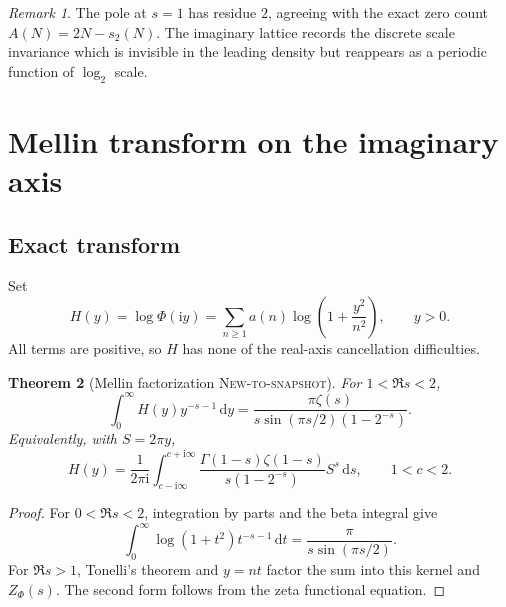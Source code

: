 \documentclass[11pt,oneside]{article}
\numberwithin{equation}{section}
\newtheorem{theorem}{Theorem}[section]
\theoremstyle{definition}
\theoremstyle{remark}
\newtheorem{remark}[theorem]{Remark}
\newcommand{\dd}{\,\mathrm d}
\newcommand{\ii}{\mathrm i}
\newcommand{\NewResult}{\textsc{New-to-snapshot}}
\begin{document}
\begin{remark}
The pole at $s=1$ has residue $2$, agreeing with the exact zero count
$A(N)=2N-s_2(N)$.  The imaginary lattice records the discrete scale invariance
which is invisible in the leading density but reappears as a periodic function
of $\log_2$ scale.
\end{remark}

\section{Mellin transform on the imaginary axis}
\label{sec:mellin}

\subsection{Exact transform}

Set
\begin{equation}
 H(y)=\log\Phi(\ii y)
     =\sum_{n\ge1}a(n)\log\left(1+\frac{y^2}{n^2}\right),
 \qquad y>0.                                               \label{eq:H}
\end{equation}
All terms are positive, so $H$ has none of the real-axis cancellation difficulties.

\begin{theorem}[Mellin factorization \NewResult]
\label{thm:Mellin}
For $1<\Re s<2$,
\begin{equation}
 \int_0^\infty H(y)y^{-s-1}\dd y
 =\frac{\pi\zeta(s)}{s\sin(\pi s/2)(1-2^{-s})}.            \label{eq:Mellin}
\end{equation}
Equivalently, with $S=2\pi y$,
\begin{equation}
 H(y)=\frac1{2\pi\ii}\int_{c-\ii\infty}^{c+\ii\infty}
 \frac{\Gamma(1-s)\zeta(1-s)}{s(1-2^{-s})}S^s\dd s,
 \qquad 1<c<2.                                             \label{eq:Mellin-inv}
\end{equation}
\end{theorem}

\begin{proof}
For $0<\Re s<2$, integration by parts and the beta integral give
\begin{equation}
 \int_0^\infty\log(1+t^2)t^{-s-1}\dd t
 =\frac{\pi}{s\sin(\pi s/2)}.                             \label{eq:kernel-Mellin}
\end{equation}
For $\Re s>1$, Tonelli's theorem and $y=nt$ factor the sum into this kernel and
$Z_\Phi(s)$.  The second form follows from the zeta functional equation.
\end{proof}
\end{document}
